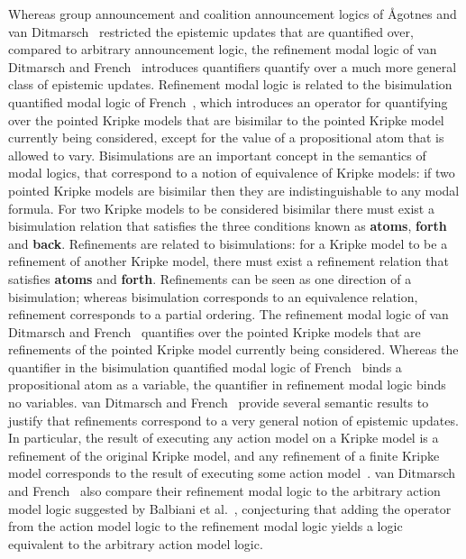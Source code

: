 Whereas group announcement and coalition announcement logics of {\AA}gotnes and van Ditmarsch~\cite{agotnes:2008} restricted the epistemic updates that are quantified over, compared to arbitrary announcement logic, the refinement modal logic of van Ditmarsch and French~\cite{vanditmarsch:2009} introduces quantifiers quantify over a much more general class of epistemic updates.
Refinement modal logic is related to the bisimulation quantified modal logic of French~\cite{french:2006}, which introduces an operator for quantifying over the pointed Kripke models that are bisimilar to the pointed Kripke model currently being considered, except for the value of a propositional atom that is allowed to vary.
Bisimulations are an important concept in the semantics of modal logics, that correspond to a notion of equivalence of Kripke models: if two pointed Kripke models are bisimilar then they are indistinguishable to any modal formula.
For two Kripke models to be considered bisimilar there must exist a bisimulation relation that satisfies the three conditions known as {\bf atoms}, {\bf forth} and {\bf back}.
Refinements are related to bisimulations: for a Kripke model to be a refinement of another Kripke model, there must exist a refinement relation that satisfies {\bf atoms} and {\bf forth}.
Refinements can be seen as one direction of a bisimulation; whereas bisimulation corresponds to an equivalence relation, refinement corresponds to a partial ordering.
The refinement modal logic of van Ditmarsch and French~\cite{vanditmarsch:2009} quantifies over the pointed Kripke models that are refinements of the pointed Kripke model currently being considered.
Whereas the quantifier in the bisimulation quantified modal logic of French~\cite{french:2006} binds a propositional atom as a variable, the quantifier in refinement modal logic binds no variables.
van Ditmarsch and French~\cite{vanditmarsch:2009} provide several semantic results to justify that refinements correspond to a very general notion of epistemic updates.
In particular, the result of executing any action model on a Kripke model is a refinement of the original Kripke model, and any refinement of a finite Kripke model corresponds to the result of executing some action model~\cite{vanditmarsch:2009}.
van Ditmarsch and French~\cite{vanditmarsch:2009} also compare their refinement modal logic to the arbitrary action model logic suggested by Balbiani et al.~\cite{balbiani:2007}, conjecturing that adding the operator from the action model logic to the refinement modal logic yields a logic equivalent to the arbitrary action model logic.

